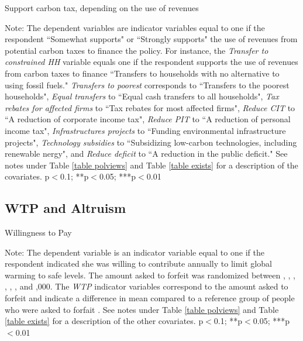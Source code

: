\documentclass{article}
\begin{document}
\begin{landscape}
	\begin{table}[h!]
	\caption{Support carbon tax, depending on the use of revenues}
	\begin{center}
		\scalebox{0.55}{}
	\end{center}
	{\footnotesize Note: The dependent variables are indicator variables equal to one if the respondent ``Somewhat supports" or ``Strongly supports" the use of revenues from potential carbon taxes to finance the policy. For instance, the \textit{Transfer to constrained HH} variable equals one if the respondent supports the use of revenues from carbon taxes to finance ``Transfers to households with no alternative to using fossil fuels." \textit{Transfers to poorest} corresponds to ``Transfers to the poorest households", \textit{Equal transfers} to ``Equal cash transfers to all households", \textit{Tax rebates for affected firms} to ``Tax rebates for most affected firms", \textit{Reduce CIT} to ``A reduction of corporate income tax", \textit{Reduce PIT} to ``A reduction of personal income tax", \textit{Infrastructures projects} to ``Funding environmental infrastructure projects", \textit{Technology subsidies} to ``Subsidizing low-carbon technologies, including renewable nergy", and \textit{Reduce deficit} to ``A reduction in the public deficit."  See notes under Table \ref{table polviews} and Table \ref{table exists} for a description of the covariates.
	\newline *p$<$0.1; **p$<$0.05; ***p$<$0.01}
\end{table}	
\end{landscape}



\clearpage
\subsection{WTP and Altruism}



\begin{table}[h!]
	\caption{Willingness to Pay}
	\begin{center}
		\scalebox{0.6}{}
	\end{center}
	{\footnotesize Note: The dependent variable is an indicator variable equal to one if the respondent indicated she was willing to contribute annually to limit global warming to safe levels. The amount asked to forfeit was randomized between , , , , , , and ,000. The \textit{WTP} indicator variables correspond to the amount asked to forfeit and indicate a difference in mean compared to a reference group of people who were asked to forfait . See notes under Table \ref{table polviews} and Table \ref{table exists} for a description of the other covariates.
	\newline *p$<$0.1; **p$<$0.05; ***p$<$0.01}
\end{table}	
\end{document}
